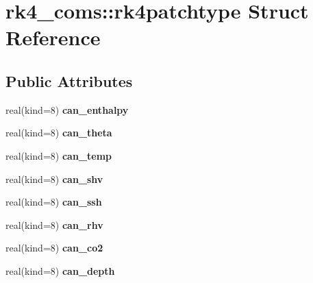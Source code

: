 \hypertarget{structrk4__coms_1_1rk4patchtype}{
\section{rk4\_\-coms::rk4patchtype Struct Reference}
\label{structrk4__coms_1_1rk4patchtype}
}
\subsection*{Public Attributes}
\begin{DoxyCompactItemize}
\item 
\hypertarget{structrk4__coms_1_1rk4patchtype_aba6612f8ec4610f300a9c5ba5cecd2e9}{
real(kind=8) {\bfseries can\_\-enthalpy}}
\label{structrk4__coms_1_1rk4patchtype_aba6612f8ec4610f300a9c5ba5cecd2e9}

\item 
\hypertarget{structrk4__coms_1_1rk4patchtype_abd2fded167b6435983e180ab92ae0823}{
real(kind=8) {\bfseries can\_\-theta}}
\label{structrk4__coms_1_1rk4patchtype_abd2fded167b6435983e180ab92ae0823}

\item 
\hypertarget{structrk4__coms_1_1rk4patchtype_af3911d0e77a6e60d4654a011a3109aab}{
real(kind=8) {\bfseries can\_\-temp}}
\label{structrk4__coms_1_1rk4patchtype_af3911d0e77a6e60d4654a011a3109aab}

\item 
\hypertarget{structrk4__coms_1_1rk4patchtype_a93e28363c792ec8efda4571da545af21}{
real(kind=8) {\bfseries can\_\-shv}}
\label{structrk4__coms_1_1rk4patchtype_a93e28363c792ec8efda4571da545af21}

\item 
\hypertarget{structrk4__coms_1_1rk4patchtype_a320ac891074a2ca8906b954af4914238}{
real(kind=8) {\bfseries can\_\-ssh}}
\label{structrk4__coms_1_1rk4patchtype_a320ac891074a2ca8906b954af4914238}

\item 
\hypertarget{structrk4__coms_1_1rk4patchtype_aecb8f675c0efd65e1dcce4f92d14fca7}{
real(kind=8) {\bfseries can\_\-rhv}}
\label{structrk4__coms_1_1rk4patchtype_aecb8f675c0efd65e1dcce4f92d14fca7}

\item 
\hypertarget{structrk4__coms_1_1rk4patchtype_a553d2a681729c3117c958bb103ce1b06}{
real(kind=8) {\bfseries can\_\-co2}}
\label{structrk4__coms_1_1rk4patchtype_a553d2a681729c3117c958bb103ce1b06}

\item 
\hypertarget{structrk4__coms_1_1rk4patchtype_a7290bf89611fdc99100a3872fe4d055c}{
real(kind=8) {\bfseries can\_\-depth}}
\label{structrk4__coms_1_1rk4patchtype_a7290bf89611fdc99100a3872fe4d055c}


\end{DoxyCompactItemize}
